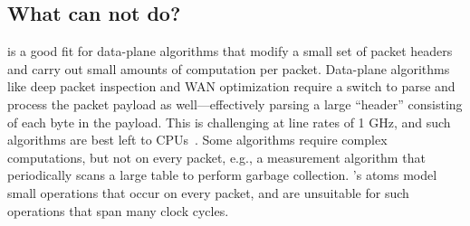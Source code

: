 \subsection{What can \absmachine not do?}
\label{ss:limitations}

\absmachine is a good fit for data-plane algorithms that modify a small set of
packet headers and carry out small amounts of computation per packet.
Data-plane algorithms like deep packet inspection and WAN optimization require
a switch to parse and process the packet payload as well---effectively parsing
a large ``header'' consisting of each byte in the payload. This is challenging
at line rates of 1 GHz, and such algorithms are best left to CPUs~\cite{e2}.
Some algorithms require complex computations, but not on every packet, e.g., a
measurement algorithm that periodically scans a large table to perform garbage
collection.  \absmachine's atoms model small operations that occur on every
packet, and are unsuitable for such operations that span many clock cycles.
